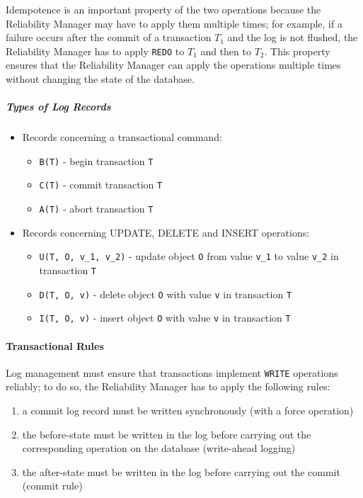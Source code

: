 \documentclass[english]{article}
\begin{document}
Idempotence is an important property of the two operations because the Reliability Manager may have to apply them multiple times;
for example, if a failure occurs after the commit of a transaction \(T_1\) and the log is not flushed, the Reliability Manager has to apply \texttt{REDO} to \(T_1\) and then to \(T_2\).
This property ensures that the Reliability Manager can apply the operations multiple times without changing the state of the database.

\subparagraph*{Types of Log Records}

\begin{itemize}
  \item Records concerning a transactional command:
        \begin{itemize}[label=\textbf{\texttt{>}}]
          \item \texttt{B(T)} - begin transaction \texttt{T}
          \item \texttt{C(T)} - commit transaction \texttt{T}
          \item \texttt{A(T)} - abort transaction \texttt{T}
        \end{itemize}
  \item Records concerning UPDATE, DELETE and INSERT operations:
        \begin{itemize}
          \item \texttt{U(T, O, v\_1, v\_2)} - update object \texttt{O} from value \texttt{v\_1} to value \texttt{v\_2} in transaction \texttt{T}
          \item \texttt{D(T, O, v)} - delete object \texttt{O} with value \texttt{v} in transaction \texttt{T}
          \item \texttt{I(T, O, v)} - insert object \texttt{O} with value \texttt{v} in transaction \texttt{T}
        \end{itemize}
\end{itemize}

\paragraph{Transactional Rules}

Log management must ensure that transactions implement \texttt{WRITE} operations reliably;
to do so, the Reliability Manager has to apply the following rules:

\begin{enumerate}
  \item\label{enum:transactional-rules-1} a commit log record must be written synchronously (with a force operation)
  \item\label{enum:transactional-rules-2} the before-state must be written in the log before carrying out the corresponding operation on the database (write-ahead logging)
  \item\label{enum:transactional-rules-3} the after-state must be written in the log before carrying out the commit (commit rule)
\end{enumerate}
\end{document}

